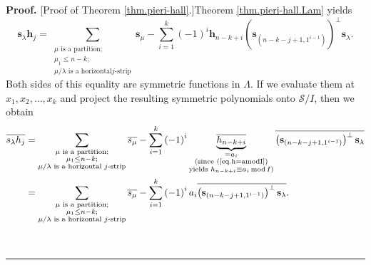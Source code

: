 \documentclass[numbers=enddot,12pt,final,onecolumn,notitlepage]{scrartcl}%
\theoremstyle{definition}
\newenvironment{proof}[1][Proof]{\noindent\textbf{#1.} }{\ \rule{0.5em}{0.5em}}
\let\sumnonlimits\sum
\renewcommand{\sum}{\sumnonlimits\limits}
\begin{document}
\begin{proof}
[Proof of Theorem \ref{thm.pieri-hall}.]Theorem \ref{thm.pieri-hall.Lam}
yields%
\[
\mathbf{s}_{\lambda}\mathbf{h}_{j}=\sum_{\substack{\mu\text{ is a
partition;}\\\mu_{1}\leq n-k;\\\mu/\lambda\text{ is a horizontal
}j\text{-strip}}}\mathbf{s}_{\mu}-\sum_{i=1}^{k}\left(  -1\right)
^{i}\mathbf{h}_{n-k+i}\left(  \mathbf{s}_{\left(  n-k-j+1,1^{i-1}\right)
}\right)  ^{\perp}\mathbf{s}_{\lambda}.
\]
Both sides of this equality are symmetric functions in $\Lambda$. If we
evaluate them at $x_{1},x_{2},\ldots,x_{k}$ and project the resulting
symmetric polynomials onto $\mathcal{S}/I$, then we obtain%
\begin{align}
\overline{s_{\lambda}h_{j}}  &  =\sum_{\substack{\mu\text{ is a partition;}%
\\\mu_{1}\leq n-k;\\\mu/\lambda\text{ is a horizontal }j\text{-strip}%
}}\overline{s_{\mu}}-\sum_{i=1}^{k}\left(  -1\right)  ^{i}%
\underbrace{\overline{h_{n-k+i}}}_{\substack{=a_{i}\\\text{(since
(\ref{eq.h=amodI})}\\\text{yields }h_{n-k+i}\equiv a_{i}\operatorname{mod}%
I\text{)}}}\overline{\left(  \mathbf{s}_{\left(  n-k-j+1,1^{i-1}\right)
}\right)  ^{\perp}\mathbf{s}_{\lambda}}\nonumber\\
&  =\sum_{\substack{\mu\text{ is a partition;}\\\mu_{1}\leq n-k;\\\mu
/\lambda\text{ is a horizontal }j\text{-strip}}}\overline{s_{\mu}}-\sum
_{i=1}^{k}\left(  -1\right)  ^{i}a_{i}\overline{\left(  \mathbf{s}_{\left(
n-k-j+1,1^{i-1}\right)  }\right)  ^{\perp}\mathbf{s}_{\lambda}}.
\label{pf.thm.pieri-hall.2}%
\end{align}



\end{proof}
\end{document}
